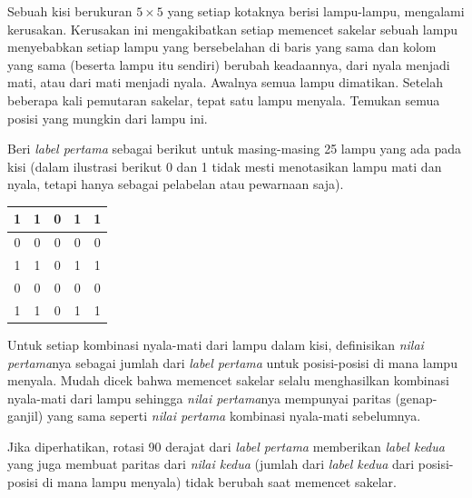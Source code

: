 \documentclass[12pt]{scrartcl}
\begin{document}
\begin{soaljawab}
    Sebuah kisi berukuran $5 \times 5$ yang setiap kotaknya berisi lampu-lampu, mengalami kerusakan. Kerusakan ini mengakibatkan setiap memencet sakelar sebuah lampu menyebabkan setiap lampu yang bersebelahan di baris yang sama dan kolom yang sama (beserta lampu itu sendiri) berubah keadaannya, dari nyala menjadi mati, atau dari mati menjadi nyala. Awalnya semua lampu dimatikan. Setelah beberapa kali pemutaran sakelar, tepat satu lampu menyala. Temukan semua posisi yang mungkin dari lampu ini.
    \begin{solusi}
        Beri \textit{label pertama} sebagai berikut untuk masing-masing 25 lampu yang ada pada kisi (dalam ilustrasi berikut 0 dan 1 tidak mesti menotasikan lampu mati dan nyala, tetapi hanya sebagai pelabelan atau pewarnaan saja).
        \begin{center}
        \begin{tabular}{ |c|c|c|c|c| }
		\hline
		1 & 1 & 0 & 1 & 1 \\
		\hline
		0 & 0 & 0 & 0 & 0 \\
		\hline
		1 & 1 & 0 & 1 & 1 \\
		\hline
		0 & 0 & 0 & 0 & 0 \\
		\hline
		1 & 1 & 0 & 1 & 1 \\
		\hline
	\end{tabular}
        \end{center}
        Untuk setiap kombinasi nyala-mati dari lampu dalam kisi, definisikan \textit{nilai pertama}nya sebagai jumlah dari \textit{label pertama} untuk posisi-posisi di mana lampu menyala. Mudah dicek bahwa memencet sakelar selalu menghasilkan kombinasi nyala-mati dari lampu sehingga \textit{nilai pertama}nya mempunyai paritas (genap-ganjil) yang sama seperti \textit{nilai pertama} kombinasi nyala-mati sebelumnya.
        
        Jika diperhatikan, rotasi 90 derajat dari \textit{label pertama} memberikan \textit{label kedua} yang juga membuat paritas dari \textit{nilai kedua} (jumlah dari \textit{label kedua} dari posisi-posisi di mana lampu menyala) tidak berubah saat memencet sakelar.


\end{solusi}
\end{soaljawab}
\end{document}
